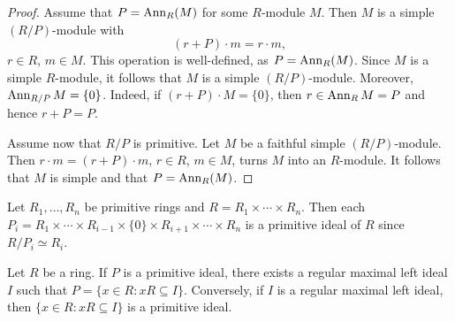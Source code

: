 \begin{proof}
	Assume that $P=\operatorname{Ann}_R(M)$ for some $R$-module $M$. Then $M$ is a simple 
	$(R/P)$-module with 
	\[
	(r+P)\cdot m=r\cdot m,
	\]
	$r\in R$, $m\in M$. This operation 
	is well-defined, as 
	$P=\operatorname{Ann}_R(M)$. Since $M$ is a simple $R$-module, it follows that $M$ is 
	a simple $(R/P)$-module. Moreover, $\operatorname{Ann}_{R/P}M=\{0\}$. Indeed, if 
	$(r+P)\cdot M=\{0\}$, then $r\in\operatorname{Ann}_RM=P$ and hence $r+P=P$.

	Assume now that $R/P$ is primitive. Let $M$ be a faithful simple $(R/P)$-module. 
	Then $r\cdot m=(r+P)\cdot m$, $r\in R$,
	$m\in M$, turns $M$ into an $R$-module. It follows that $M$ is simple and that $P=\operatorname{Ann}_R(M)$. 
\end{proof}



\begin{example}
	Let $R_1,\dots,R_n$ be primitive rings and $R=R_1\times\cdots\times
	R_n$. Then each $P_i=R_1\times\cdots\times R_{i-1}\times\{0\}\times
	R_{i+1}\times\cdots\times R_n$ is a primitive ideal of $R$ since 
	$R/P_i\simeq R_i$.
\end{example}

%

\begin{lemma}
	\label{lemma:maxprim}
	Let $R$ be a ring. If $P$ is a primitive ideal, there exists a regular 
        maximal left ideal $I$ such that $P=\{x\in R:xR\subseteq I\}$.
	Conversely, if $I$ is a regular maximal left ideal, then 
	$\{x\in R:xR\subseteq I\}$ is a primitive ideal. 
\end{lemma}

